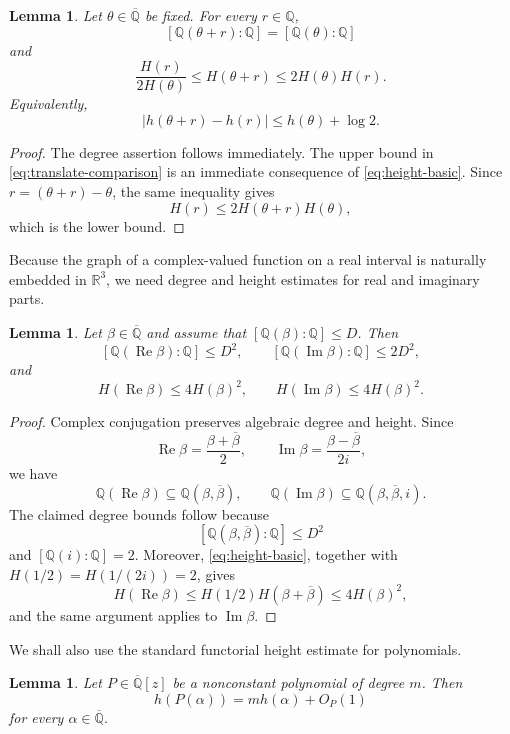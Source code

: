 \documentclass[11pt]{amsart}
\newtheorem{lemma}[theorem]{Lemma}
\theoremstyle{remark}
\newcommand{\Q}{\mathbb{Q}}
\newcommand{\R}{\mathbb{R}}
\newcommand{\Qbar}{\overline{\mathbb{Q}}}
\DeclareMathOperator{\RePart}{Re}
\DeclareMathOperator{\ImPart}{Im}
\begin{document}
\begin{lemma}\label{lem:translate-height}
Let $\theta\in\Qbar$ be fixed. For every $r\in\Q$,
\[
[\Q(\theta+r):\Q]=[\Q(\theta):\Q]
\]
and
\begin{equation}\label{eq:translate-comparison}
\frac{H(r)}{2H(\theta)}
\leq H(\theta+r)
\leq2H(\theta)H(r).
\end{equation}
Equivalently,
\[
|h(\theta+r)-h(r)|
\leq h(\theta)+\log2.
\]
\end{lemma}

\begin{proof}
The degree assertion follows immediately. The upper bound in \eqref{eq:translate-comparison} is an immediate consequence of \eqref{eq:height-basic}. Since $r=(\theta+r)-\theta$, the same inequality gives
\[
H(r)\leq2H(\theta+r)H(\theta),
\]
which is the lower bound.
\end{proof}

Because the graph of a complex-valued function on a real interval is naturally embedded in $\R^3$, we need degree and height estimates for real and imaginary parts.

\begin{lemma}\label{lem:real-imaginary}
Let $\beta\in\Qbar$ and assume that $[\Q(\beta):\Q]\leq D$. Then
\[
[\Q(\RePart\beta):\Q]\leq D^2,
\qquad
[\Q(\ImPart\beta):\Q]\leq2D^2,
\]
and
\[
H(\RePart\beta)\leq4H(\beta)^2,
\qquad
H(\ImPart\beta)\leq4H(\beta)^2.
\]
\end{lemma}

\begin{proof}
Complex conjugation preserves algebraic degree and height. Since
\[
\RePart\beta=\frac{\beta+\overline\beta}{2},
\qquad
\ImPart\beta=\frac{\beta-\overline\beta}{2i},
\]
we have
\[
\Q(\RePart\beta)\subseteq\Q(\beta,\overline\beta),
\qquad
\Q(\ImPart\beta)\subseteq\Q(\beta,\overline\beta,i).
\]
The claimed degree bounds follow because
\[
[\Q(\beta,\overline\beta):\Q]\leq D^2
\]
and $[\Q(i):\Q]=2$. Moreover, \eqref{eq:height-basic}, together with $H(1/2)=H(1/(2i))=2$, gives
\[
H(\RePart\beta)
\leq H(1/2)H(\beta+\overline\beta)
\leq4H(\beta)^2,
\]
and the same argument applies to $\ImPart\beta$.
\end{proof}

We shall also use the standard functorial height estimate for polynomials.

\begin{lemma}\label{lem:polynomial-height}
Let $P\in\Qbar[z]$ be a nonconstant polynomial of degree $m$. Then
\begin{equation}\label{eq:polynomial-height}
h(P(\alpha))=m h(\alpha)+O_P(1)
\end{equation}
for every $\alpha\in\Qbar$.
\end{lemma}
\end{document}
